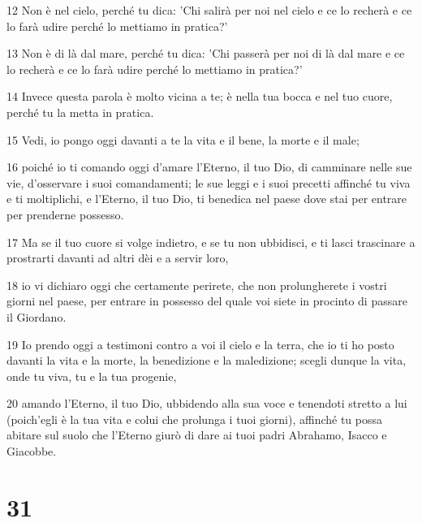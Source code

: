 \par 12 Non è nel cielo, perché tu dica: 'Chi salirà per noi nel cielo e ce lo recherà e ce lo farà udire perché lo mettiamo in pratica?'
\par 13 Non è di là dal mare, perché tu dica: 'Chi passerà per noi di là dal mare e ce lo recherà e ce lo farà udire perché lo mettiamo in pratica?'
\par 14 Invece questa parola è molto vicina a te; è nella tua bocca e nel tuo cuore, perché tu la metta in pratica.
\par 15 Vedi, io pongo oggi davanti a te la vita e il bene, la morte e il male;
\par 16 poiché io ti comando oggi d'amare l'Eterno, il tuo Dio, di camminare nelle sue vie, d'osservare i suoi comandamenti; le sue leggi e i suoi precetti affinché tu viva e ti moltiplichi, e l'Eterno, il tuo Dio, ti benedica nel paese dove stai per entrare per prenderne possesso.
\par 17 Ma se il tuo cuore si volge indietro, e se tu non ubbidisci, e ti lasci trascinare a prostrarti davanti ad altri dèi e a servir loro,
\par 18 io vi dichiaro oggi che certamente perirete, che non prolungherete i vostri giorni nel paese, per entrare in possesso del quale voi siete in procinto di passare il Giordano.
\par 19 Io prendo oggi a testimoni contro a voi il cielo e la terra, che io ti ho posto davanti la vita e la morte, la benedizione e la maledizione; scegli dunque la vita, onde tu viva, tu e la tua progenie,
\par 20 amando l'Eterno, il tuo Dio, ubbidendo alla sua voce e tenendoti stretto a lui (poich'egli è la tua vita e colui che prolunga i tuoi giorni), affinché tu possa abitare sul suolo che l'Eterno giurò di dare ai tuoi padri Abrahamo, Isacco e Giacobbe.

\chapter{31}

